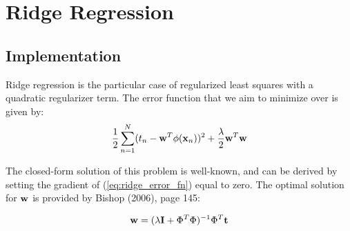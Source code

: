 
\section{Ridge Regression}\label{sec:ridge_reg}

\subsection{Implementation}
Ridge regression is the particular case of regularized least squares with a quadratic regularizer term.  The error function that we aim to minimize over is given by:
\begin{equation} \label{eq:ridge_error_fn}
\frac{1}{2} \sum_{n=1}^{N} (t_n - \boldsymbol{\mathbf{w}}^T \phi (\boldsymbol{\mathbf{x}}_n) )^2 + \frac{\lambda}{2} \boldsymbol{\mathbf{w}}^T \boldsymbol{\mathbf{w}}
\end{equation}

The closed-form solution of this problem is well-known, and can be derived by setting the gradient of (\ref{eq:ridge_error_fn}) equal to zero.  The optimal solution for $\boldsymbol{\mathbf{w}}$ is provided by Bishop (2006), page 145:

\begin{equation} \label{eq:ridge_sol}
\boldsymbol{\mathbf{w}} = (\lambda \boldsymbol{\mathbf{I}} + \Phi^T \Phi)^{-1} \Phi^T \boldsymbol{\mathbf{t}}
\end{equation}


